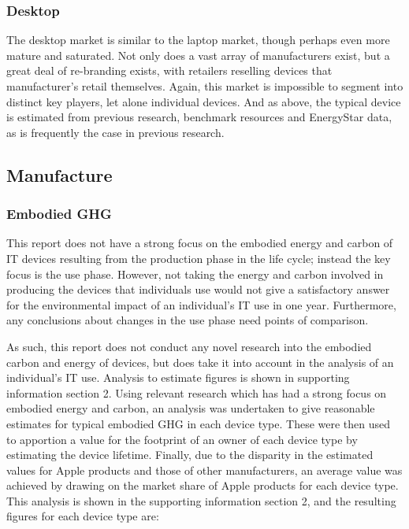 \documentclass[conference]{IEEEtran}
\begin{document}
\subsubsection{Desktop}

The desktop market is similar to the laptop market, though perhaps
even more mature and saturated. Not only does a vast array of
manufacturers exist, but a great deal of re-branding exists, with
retailers reselling devices that manufacturer’s retail
themselves. Again, this market is impossible to segment into distinct
key players, let alone individual devices. And as above, the typical
device is estimated from previous research, benchmark resources and
EnergyStar data, as is frequently the case in previous research.


\subsection{Manufacture}

\subsubsection{Embodied GHG}

This report does not have a strong focus on the embodied energy and
carbon of IT devices resulting from the production phase in the life
cycle; instead the key focus is the use phase. However, not taking the
energy and carbon involved in producing the devices that individuals
use would not give a satisfactory answer for the environmental impact
of an individual's IT use in one year. Furthermore, any conclusions
about changes in the use phase need points of comparison.

As such, this report does not conduct any novel research into the
embodied carbon and energy of devices, but does take it into account
in the analysis of an individual’s IT use. Analysis to estimate
figures is shown in supporting information section 2. Using relevant
research which has had a strong focus on embodied energy and carbon,
an analysis was undertaken to give reasonable estimates for typical
embodied GHG in each device type. These were then used to apportion a
value for the footprint of an owner of each device type by estimating
the device lifetime. Finally, due to the disparity in the estimated
values for Apple products and those of other manufacturers, an average
value was achieved by drawing on the market share of Apple products
for each device type. This analysis is shown in the supporting
information section 2, and the resulting figures for each device type
are:
\end{document}
